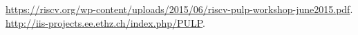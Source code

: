 \begin{thebibliography}{2}
 \url{https://riscv.org/wp-content/uploads/2015/06/riscv-pulp-workshop-june2015.pdf}.
 \url{http://iis-projects.ee.ethz.ch/index.php/PULP}.
\end{thebibliography}
